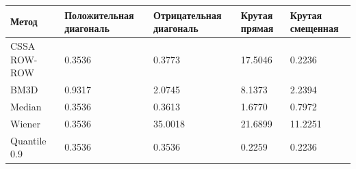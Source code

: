 \begin{tabular}{|l|l|l|l|l|}
\hline
Метод & Положительная диагональ & Отрицательная диагональ & Крутая прямая & Крутая смещенная \\
\hline
CSSA ROW-ROW & 0.3536 & 0.3773 & 17.5046 & 0.2236 \\
\hline
BM3D & 0.9317 & 2.0745 & 8.1373 & 2.2394 \\
\hline
Median & 0.3536 & 0.3613 & 1.6770 & 0.7972 \\
\hline
Wiener & 0.3536 & 35.0018 & 21.6899 & 11.2251 \\
\hline
Quantile 0.9 & 0.3536 & 0.3536 & 0.2259 & 0.2236 \\
\hline
\end{tabular}
